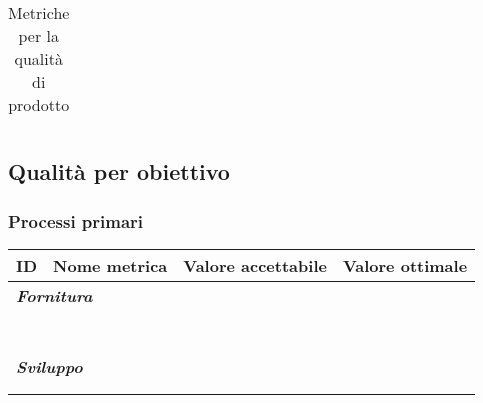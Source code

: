 {{\begin{table}[H]
\begin{tabularx}{\textwidth}{p{}|p{}|X|X}
    \end{tabularx}
    \caption{Metriche per la qualità di prodotto}
    \end{table}

    





\subsection{Qualità per obiettivo}
\subsubsection{Processi primari}

 
    {\renewcommand{\arraystretch}{1.5}
    \begin{tabularx}{\textwidth}{p{}|p{}|X|X}
    \textbf{ID} & \textbf{Nome metrica} & \textbf{Valore accettabile} & \textbf{Valore ottimale}  \\
    \hline
    \multicolumn{4}{l}{\cellcolor{primarycolor}\textbf{\textit{Fornitura}}} \\
    \hline
     &  &  &  \\
    \hline
     &  &  &  \\
    \hline
     &  &  &  \\
    \hline
     &  &  &  \\
    \hline
     &  &  &  \\
    \hline
     &  &  &  \\
    \hline
     &  &  &  \\
    \hline
    \multicolumn{4}{l}{\cellcolor{primarycolor}\textbf{\textit{Sviluppo}}} \\
    \hline
     &  &  &  \\
    \hline
     &  &  &  \\
    \end{tabularx}}

}}

